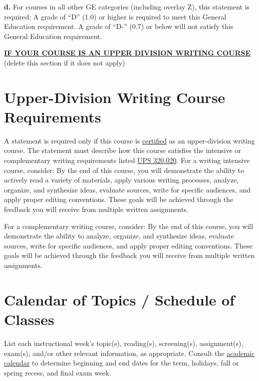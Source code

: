 \documentclass[12pt]{article}
\begin{document}
\textbf{d.} {\color{annotationblue}For courses in all other GE categories (including overlay Z), this statement is required:} A grade of ``D'' (1.0) or higher is required to meet this General Education requirement. A grade of ``D-'' (0.7) or below will not satisfy this General Education requirement.

\textbf{\uline{IF YOUR COURSE IS AN UPPER DIVISION WRITING COURSE}} {\color{annotationblue}(delete this section if it does not apply)}

\section{Upper-Division Writing Course Requirements}

{\color{annotationblue}A statement is required only if this course is \uline{certified} as an upper-division writing course. The statement must describe how this course satisfies the intensive or complementary writing requirements listed \href{https://www.fullerton.edu/senate/publications_policies_resolutions/ups/UPS\%20300/UPS\%20320.020.pdf}{UPS 320.020}.} {\color{suggestionred}For a writing intensive course, consider: By the end of this course, you will demonstrate the ability to actively read a variety of materials, apply various writing processes, analyze, organize, and synthesize ideas, evaluate sources, write for specific audiences, and apply proper editing conventions. These goals will be achieved through the feedback you will receive from multiple written assignments.}

{\color{suggestionred}For a complementary writing course, consider: By the end of this course, you will demonstrate the ability to analyze, organize, and synthesize ideas, evaluate sources, write for specific audiences, and apply proper editing conventions. These goals will be achieved through the feedback you will receive from multiple written assignments.}

\section{Calendar of Topics / Schedule of Classes}

{\color{annotationblue}List each instructional week's topic(s), reading(s), screening(s), assignment(s), exam(s), and/or other relevant information, as appropriate. Consult the \href{https://apps.fullerton.edu/AcademicCalendar/}{academic calendar} to determine beginning and end dates for the term, holidays, fall or spring recess, and final exam week.}
\end{document}
